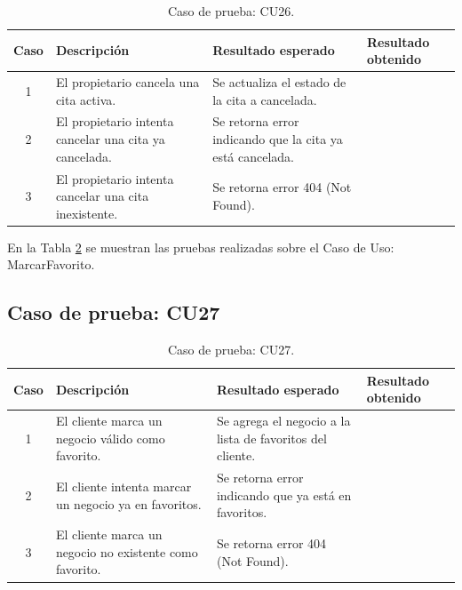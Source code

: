 \begin{table}[H]
\centering
\label{tab:cu26_white_test}
\renewcommand{\arraystretch}{1.3}
\begin{tabular}{|c|p{5cm}|p{6cm}|p{2.5cm}|}
\hline
\rowcolor[RGB]{217,217,217}
\textbf{Caso} & \textbf{Descripción} & \textbf{Resultado esperado} & \textbf{Resultado obtenido} \\
\hline

1 &
El propietario cancela una cita activa. &
Se actualiza el estado de la cita a cancelada. &
 \\
\hline

2 &
El propietario intenta cancelar una cita ya cancelada. &
Se retorna error indicando que la cita ya está cancelada. &
 \\
\hline

3 &
El propietario intenta cancelar una cita inexistente. &
Se retorna error 404 (Not Found). &
 \\
\hline

\end{tabular}
\caption{Caso de prueba: CU26.}
\label{tab:cu26_white_test}
\end{table}


En la Tabla \ref{tab:cu27_white_test} se muestran las pruebas realizadas sobre el Caso de Uso: MarcarFavorito.

\subsection{Caso de prueba: CU27}

\begin{table}[H]
\centering
\label{tab:cu27_white_test}
\renewcommand{\arraystretch}{1.3}
\begin{tabular}{|c|p{5cm}|p{6cm}|p{2.5cm}|}
\hline
\rowcolor[RGB]{217,217,217}
\textbf{Caso} & \textbf{Descripción} & \textbf{Resultado esperado} & \textbf{Resultado obtenido} \\
\hline

1 &
El cliente marca un negocio válido como favorito. &
Se agrega el negocio a la lista de favoritos del cliente. &
 \\
\hline

2 &
El cliente intenta marcar un negocio ya en favoritos. &
Se retorna error indicando que ya está en favoritos. &
 \\
\hline

3 &
El cliente marca un negocio no existente como favorito. &
Se retorna error 404 (Not Found). &
 \\
\hline

\end{tabular}
\caption{Caso de prueba: CU27.}
\label{tab:cu27_white_test}
\end{table}


